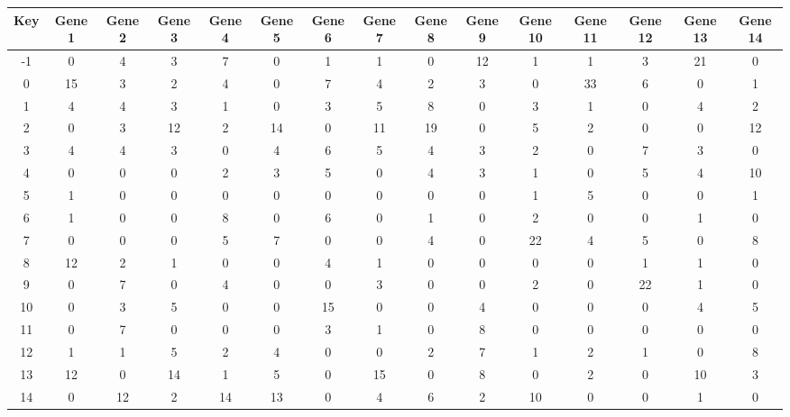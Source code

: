 \begin{tabular}{|c|c|c|c|c|c|c|c|c|c|c|c|c|c|c|}
\hline
Key & Gene 1 & Gene 2 & Gene 3 & Gene 4 & Gene 5 & Gene 6 & Gene 7 & Gene 8 & Gene 9 & Gene 10 & Gene 11 & Gene 12 & Gene 13 & Gene 14 \\
\hline
-1 & 0 & 4 & 3 & 7 & 0 & 1 & 1 & 0 & 12 & 1 & 1 & 3 & 21 & 0 \\
0 & 15 & 3 & 2 & 4 & 0 & 7 & 4 & 2 & 3 & 0 & 33 & 6 & 0 & 1 \\
1 & 4 & 4 & 3 & 1 & 0 & 3 & 5 & 8 & 0 & 3 & 1 & 0 & 4 & 2 \\
2 & 0 & 3 & 12 & 2 & 14 & 0 & 11 & 19 & 0 & 5 & 2 & 0 & 0 & 12 \\
3 & 4 & 4 & 3 & 0 & 4 & 6 & 5 & 4 & 3 & 2 & 0 & 7 & 3 & 0 \\
4 & 0 & 0 & 0 & 2 & 3 & 5 & 0 & 4 & 3 & 1 & 0 & 5 & 4 & 10 \\
5 & 1 & 0 & 0 & 0 & 0 & 0 & 0 & 0 & 0 & 1 & 5 & 0 & 0 & 1 \\
6 & 1 & 0 & 0 & 8 & 0 & 6 & 0 & 1 & 0 & 2 & 0 & 0 & 1 & 0 \\
7 & 0 & 0 & 0 & 5 & 7 & 0 & 0 & 4 & 0 & 22 & 4 & 5 & 0 & 8 \\
8 & 12 & 2 & 1 & 0 & 0 & 4 & 1 & 0 & 0 & 0 & 0 & 1 & 1 & 0 \\
9 & 0 & 7 & 0 & 4 & 0 & 0 & 3 & 0 & 0 & 2 & 0 & 22 & 1 & 0 \\
10 & 0 & 3 & 5 & 0 & 0 & 15 & 0 & 0 & 4 & 0 & 0 & 0 & 4 & 5 \\
11 & 0 & 7 & 0 & 0 & 0 & 3 & 1 & 0 & 8 & 0 & 0 & 0 & 0 & 0 \\
12 & 1 & 1 & 5 & 2 & 4 & 0 & 0 & 2 & 7 & 1 & 2 & 1 & 0 & 8 \\
13 & 12 & 0 & 14 & 1 & 5 & 0 & 15 & 0 & 8 & 0 & 2 & 0 & 10 & 3 \\
14 & 0 & 12 & 2 & 14 & 13 & 0 & 4 & 6 & 2 & 10 & 0 & 0 & 1 & 0 \\
\hline
\end{tabular}